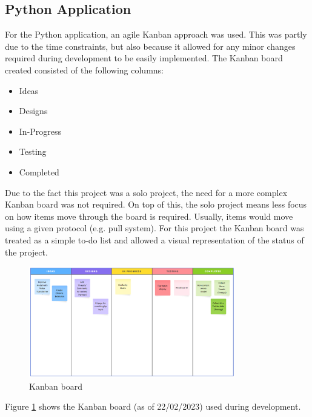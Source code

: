 \subsection{Python Application}
For the Python application, an agile Kanban approach was used. This was partly due to the time constraints, but also because it allowed for
any minor changes required during development to be easily implemented. The Kanban board created consisted of the following columns:
\begin{itemize}
    \item Ideas
    \item Designs
    \item In-Progress
    \item Testing
    \item Completed
\end{itemize}
Due to the fact this project was a solo project, the need for a more complex Kanban board was not required. On top of this, the solo project
means less focus on how items move through the board is required. Usually, items would move using a given protocol (e.g. pull system). For this
project the Kanban board was treated as a simple to-do list and allowed a visual representation of the status of the project.
\begin{figure}
    \centering
    \includegraphics[width=0.8\textwidth]{../images/kanban.png}
    \caption{Kanban board}
    \label{fig:kanban}
\end{figure}

Figure \ref{fig:kanban} shows the Kanban board (as of 22/02/2023) used during development.